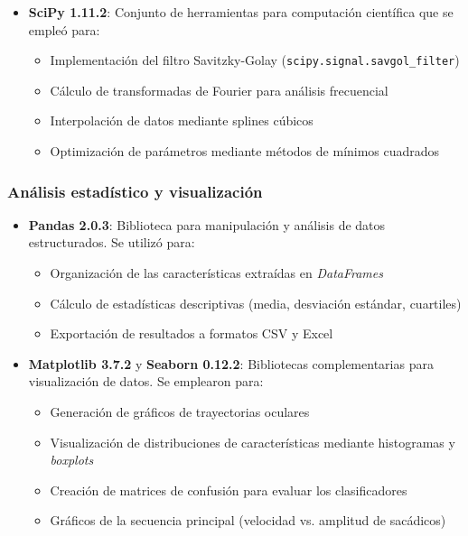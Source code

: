 \begin{itemize}
	\item \textbf{SciPy 1.11.2}: Conjunto de herramientas para computación científica que se empleó para:
	\begin{itemize}
		\item Implementación del filtro Savitzky-Golay (\texttt{scipy.signal.savgol\_filter})
		\item Cálculo de transformadas de Fourier para análisis frecuencial
		\item Interpolación de datos mediante splines cúbicos
		\item Optimización de parámetros mediante métodos de mínimos cuadrados
	\end{itemize}
\end{itemize}

\subsubsection{Análisis estadístico y visualización}

\begin{itemize}
	\item \textbf{Pandas 2.0.3}: Biblioteca para manipulación y análisis de datos estructurados.
	Se utilizó para:
	\begin{itemize}
		\item Organización de las características extraídas en \textit{DataFrames}
		\item Cálculo de estadísticas descriptivas (media, desviación estándar, cuartiles)
		\item Exportación de resultados a formatos CSV y Excel
	\end{itemize}
	
	\item \textbf{Matplotlib 3.7.2} y \textbf{Seaborn 0.12.2}: Bibliotecas complementarias para visualización de datos.
	Se emplearon para:
	\begin{itemize}
		\item Generación de gráficos de trayectorias oculares
		\item Visualización de distribuciones de características mediante histogramas y \textit{boxplots}
		\item Creación de matrices de confusión para evaluar los clasificadores
		\item Gráficos de la secuencia principal (velocidad vs. amplitud de sacádicos)
	\end{itemize}
\end{itemize}

